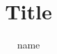 \documentclass[header, margin=big]{../hsrzf}
\title{Title}
\author{name}
\begin{document}
\maketitle

\blinddocument
\end{document}
